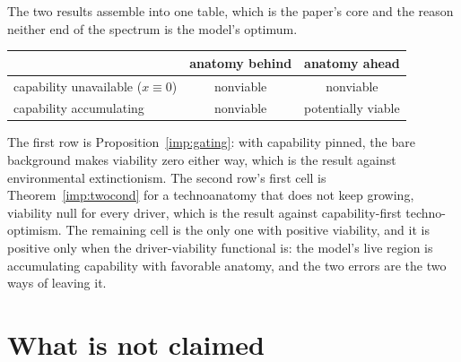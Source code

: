 The two results assemble into one table, which is the paper's core and
the reason neither end of the spectrum is the model's optimum.
\begin{center}
\begin{tabular}{@{}l|cc@{}}
\toprule
 & anatomy behind & anatomy ahead\\
\midrule
capability unavailable ($x\equiv0$) & nonviable & nonviable\\
capability accumulating & nonviable & potentially viable\\
\bottomrule
\end{tabular}
\end{center}
The first row is Proposition~\ref{imp:gating}: with capability pinned,
the bare background makes viability zero either way, which
is the result against environmental extinctionism. The second row's
first cell is Theorem~\ref{imp:twocond} for a technoanatomy that does not keep growing, viability null
for every driver, which is the result against capability-first
techno-optimism. The remaining cell is the only one with positive
viability, and it is positive only when the driver-viability functional
is: the model's live region is accumulating capability with favorable
anatomy, and the two errors are the two ways of leaving it.

\section{What is not claimed}\label{sec:fences}

